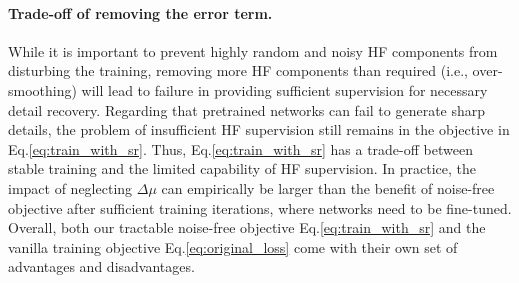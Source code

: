 \documentclass[letterpaper]{article} %
\begin{document}
\paragraph{Trade-off of removing the error term.}
\label{section:trade-off of approximated noise-free objective}
While it is important to prevent highly random and noisy HF components from disturbing the training, removing more HF components than required (i.e., over-smoothing) will lead to failure in providing sufficient supervision for necessary detail recovery.
%
Regarding that pretrained networks can fail to generate sharp details, the problem of insufficient HF supervision still remains in the objective in Eq.\eqref{eq:train_with_sr}.
%
Thus, Eq.\eqref{eq:train_with_sr} has a trade-off between stable training and the limited capability of HF supervision. In practice, the impact of neglecting $\Delta\mu$ can empirically be larger than the benefit of noise-free objective after sufficient training iterations, where networks need to be fine-tuned. Overall, both our tractable noise-free objective Eq.\eqref{eq:train_with_sr} and the vanilla training objective Eq.\eqref{eq:original_loss} come with their own set of advantages and disadvantages.

\end{document}
